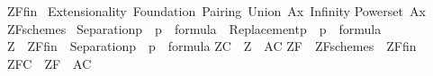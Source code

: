 \begin{isabelle}%
ZF{\isacharunderscore}{\kern0pt}fin\ {\isasymequiv}\isanewline
{\isacharbraceleft}{\kern0pt}{\isasymcdot}Extensionality{\isasymcdot}{\isacharcomma}{\kern0pt}\ {\isasymcdot}Foundation{\isasymcdot}{\isacharcomma}{\kern0pt}\ {\isasymcdot}Pairing{\isasymcdot}{\isacharcomma}{\kern0pt}\ {\isasymcdot}Union\ Ax{\isasymcdot}{\isacharcomma}{\kern0pt}\ {\isasymcdot}Infinity{\isasymcdot}{\isacharcomma}{\kern0pt}\isanewline
\isaindent{{\isacharbraceleft}{\kern0pt}}{\isasymcdot}Powerset\ Ax{\isasymcdot}{\isacharbraceright}{\kern0pt}\isasep\isanewline\isanewline%
ZF{\isacharunderscore}{\kern0pt}schemes\ {\isasymequiv}\isanewline
{\isacharbraceleft}{\kern0pt}{\isasymcdot}Separation{\isacharparenleft}{\kern0pt}p{\isacharparenright}{\kern0pt}{\isasymcdot}\ {\isachardot}{\kern0pt}\ p\ {\isasymin}\ formula{\isacharbraceright}{\kern0pt}\ {\isasymunion}\ {\isacharbraceleft}{\kern0pt}{\isasymcdot}Replacement{\isacharparenleft}{\kern0pt}p{\isacharparenright}{\kern0pt}{\isasymcdot}\ {\isachardot}{\kern0pt}\ p\ {\isasymin}\ formula{\isacharbraceright}{\kern0pt}\isasep\isanewline\isanewline%
{\isasymcdot}Z{\isasymcdot}\ {\isasymequiv}\ ZF{\isacharunderscore}{\kern0pt}fin\ {\isasymunion}\ {\isacharbraceleft}{\kern0pt}{\isasymcdot}Separation{\isacharparenleft}{\kern0pt}p{\isacharparenright}{\kern0pt}{\isasymcdot}\ {\isachardot}{\kern0pt}\ p\ {\isasymin}\ formula{\isacharbraceright}{\kern0pt}\isasep\isanewline%
ZC\ {\isasymequiv}\ {\isasymcdot}Z{\isasymcdot}\ {\isasymunion}\ {\isacharbraceleft}{\kern0pt}{\isasymcdot}AC{\isasymcdot}{\isacharbraceright}{\kern0pt}\isasep\isanewline%
ZF\ {\isasymequiv}\ ZF{\isacharunderscore}{\kern0pt}schemes\ {\isasymunion}\ ZF{\isacharunderscore}{\kern0pt}fin\isasep\isanewline%
ZFC\ {\isasymequiv}\ ZF\ {\isasymunion}\ {\isacharbraceleft}{\kern0pt}{\isasymcdot}AC{\isasymcdot}{\isacharbraceright}{\kern0pt}%
\end{isabelle}%

